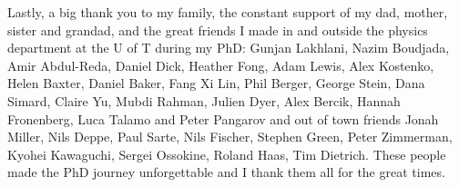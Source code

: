 \begin{preliminary}
\begin{acknowledgements}
Lastly, a big thank you to my family, the constant support of my dad, mother, sister and grandad, and the great friends I made in and outside the physics department at the U of T during my PhD: Gunjan Lakhlani, Nazim Boudjada, Amir Abdul-Reda, Daniel Dick, Heather Fong, Adam Lewis, Alex Kostenko, Helen Baxter, Daniel Baker, Fang Xi Lin, Phil Berger, George Stein, Dana Simard, Claire Yu, Mubdi Rahman, Julien Dyer, Alex Bercik, Hannah Fronenberg, Luca Talamo and Peter Pangarov and out of town friends Jonah Miller, Nils Deppe, Paul Sarte, Nils Fischer, Stephen Green, Peter Zimmerman, Kyohei Kawaguchi, Sergei Ossokine, Roland Haas, Tim Dietrich. These people made the PhD journey unforgettable and I thank them all for the great times.


\end{acknowledgements}

\tableofcontents

\listoftables

\listoffigures

\end{preliminary}









